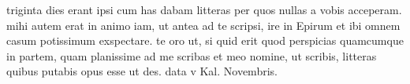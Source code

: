


 triginta dies erant ipsi cum has dabam litteras per quos nullas a vobis acceperam. mihi autem erat in animo iam, ut antea ad te scripsi, ire in Epirum et ibi omnem casum potissimum exspectare. te oro ut, si quid erit quod perspicias quamcumque in partem, quam planissime ad me scribas et meo nomine, ut scribis, litteras quibus putabis opus esse ut des. data v Kal. Novembris.
